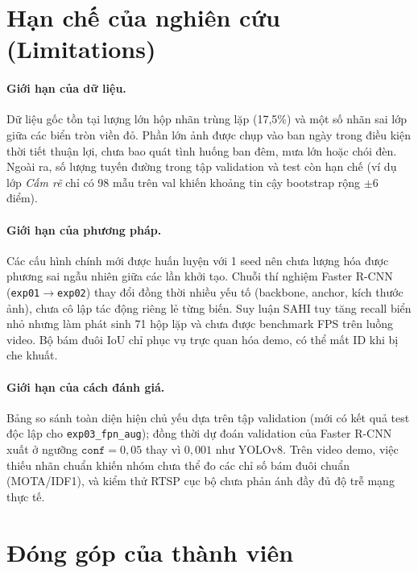 \documentclass[11pt]{article}
\begin{document}

\section*{Hạn chế của nghiên cứu (Limitations)}

\paragraph{Giới hạn của dữ liệu.}
Dữ liệu gốc tồn tại lượng lớn hộp nhãn trùng lặp (17,5\%) và một số nhãn sai lớp giữa các biển tròn viền đỏ. Phần lớn ảnh được chụp vào ban ngày trong điều kiện thời tiết thuận lợi, chưa bao quát tình huống ban đêm, mưa lớn hoặc chói đèn. Ngoài ra, số lượng tuyến đường trong tập validation và test còn hạn chế (ví dụ lớp \textit{Cấm rẽ} chỉ có 98 mẫu trên val khiến khoảng tin cậy bootstrap rộng $\pm 6$ điểm).

\paragraph{Giới hạn của phương pháp.}
Các cấu hình chính mới được huấn luyện với 1 seed nên chưa lượng hóa được phương sai ngẫu nhiên giữa các lần khởi tạo. Chuỗi thí nghiệm Faster R-CNN (\texttt{exp01}$\to$\texttt{exp02}) thay đổi đồng thời nhiều yếu tố (backbone, anchor, kích thước ảnh), chưa cô lập tác động riêng lẻ từng biến. Suy luận SAHI tuy tăng recall biển nhỏ nhưng làm phát sinh 71 hộp lặp và chưa được benchmark FPS trên luồng video. Bộ bám đuôi IoU chỉ phục vụ trực quan hóa demo, có thể mất ID khi bị che khuất.

\paragraph{Giới hạn của cách đánh giá.}
Bảng so sánh toàn diện hiện chủ yếu dựa trên tập validation (mới có kết quả test độc lập cho \texttt{exp03\_fpn\_aug}); đồng thời dự đoán validation của Faster R-CNN xuất ở ngưỡng $\texttt{conf}=0{,}05$ thay vì $0{,}001$ như YOLOv8. Trên video demo, việc thiếu nhãn chuẩn khiến nhóm chưa thể đo các chỉ số bám đuôi chuẩn (MOTA/IDF1), và kiểm thử RTSP cục bộ chưa phản ánh đầy đủ độ trễ mạng thực tế.

\section*{Đóng góp của thành viên}
\end{document}

